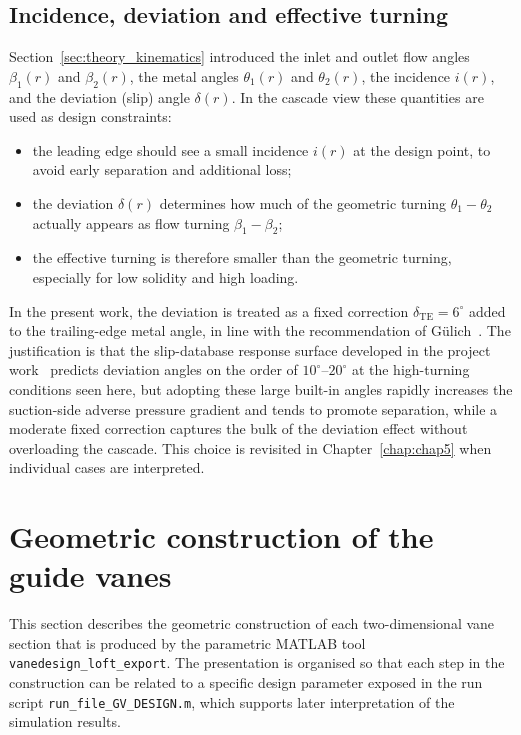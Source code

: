 \subsection{Incidence, deviation and effective turning}
\label{sec:theory_incidence_deviation}
 
Section~\ref{sec:theory_kinematics} introduced the inlet and outlet flow angles $\beta_1(r)$ and $\beta_2(r)$, the metal angles $\theta_1(r)$ and $\theta_2(r)$, the incidence $i(r)$, and the deviation (slip) angle $\delta(r)$. In the cascade view these quantities are used as design constraints:
\begin{itemize}
  \item the leading edge should see a small incidence $i(r)$ at the design point, to avoid early separation and additional loss;
  \item the deviation $\delta(r)$ determines how much of the geometric turning $\theta_1 - \theta_2$ actually appears as flow turning $\beta_1 - \beta_2$;
  \item the effective turning is therefore smaller than the geometric turning, especially for low solidity and high loading.
\end{itemize}
In the present work, the deviation is treated as a fixed correction $\delta_{\mathrm{TE}} = 6^\circ$ added to the trailing-edge metal angle, in line with the recommendation of G\"ulich~\cite{Gulich2010}. The justification is that the slip-database response surface developed in the project work~\cite{Leonsen2025} predicts deviation angles on the order of $10^\circ$--$20^\circ$ at the high-turning conditions seen here, but adopting these large built-in angles rapidly increases the suction-side adverse pressure gradient and tends to promote separation, while a moderate fixed correction captures the bulk of the deviation effect without overloading the cascade. This choice is revisited in Chapter~\ref{chap:chap5} when individual cases are interpreted.
 
\section{Geometric construction of the guide vanes}
\label{sec:theory_geometric_construction}
 
This section describes the geometric construction of each two-dimensional vane section that is produced by the parametric MATLAB tool \texttt{vanedesign\_loft\_export}. The presentation is organised so that each step in the construction can be related to a specific design parameter exposed in the run script \texttt{run\_file\_GV\_DESIGN.m}, which supports later interpretation of the simulation results.
 
